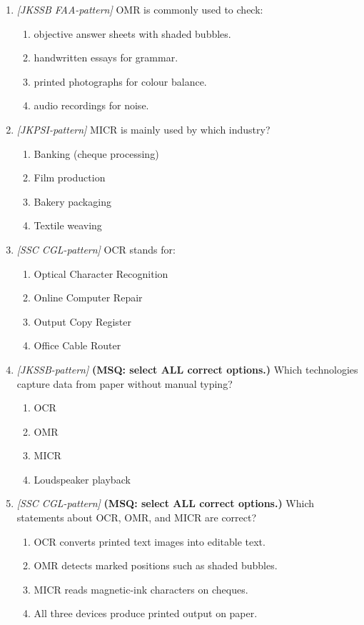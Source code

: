 \documentclass[11pt]{article}
\begin{document}
\begin{enumerate}[label=\textbf{Q\arabic*.}, leftmargin=*]
\item \textit{[JKSSB FAA-pattern]} OMR is commonly used to check:
  \begin{enumerate}[label=\Alph*.]
    \item objective answer sheets with shaded bubbles.
    \item handwritten essays for grammar.
    \item printed photographs for colour balance.
    \item audio recordings for noise.
  \end{enumerate}
\item \textit{[JKPSI-pattern]} MICR is mainly used by which industry?
  \begin{enumerate}[label=\Alph*.]
    \item Banking (cheque processing)
    \item Film production
    \item Bakery packaging
    \item Textile weaving
  \end{enumerate}
\item \textit{[SSC CGL-pattern]} OCR stands for:
  \begin{enumerate}[label=\Alph*.]
    \item Optical Character Recognition
    \item Online Computer Repair
    \item Output Copy Register
    \item Office Cable Router
  \end{enumerate}
\item \textit{[JKSSB-pattern]} \textbf{(MSQ: select ALL correct options.)} Which technologies capture data from paper without manual typing?
  \begin{enumerate}[label=\Alph*.]
    \item OCR
    \item OMR
    \item MICR
    \item Loudspeaker playback
  \end{enumerate}
\item \textit{[SSC CGL-pattern]} \textbf{(MSQ: select ALL correct options.)} Which statements about OCR, OMR, and MICR are correct?
  \begin{enumerate}[label=\Alph*.]
    \item OCR converts printed text images into editable text.
    \item OMR detects marked positions such as shaded bubbles.
    \item MICR reads magnetic-ink characters on cheques.
    \item All three devices produce printed output on paper.
  \end{enumerate}
\end{enumerate}
\def\JKSSBLessonID{13}\def\JKSSBAnswers{0}
\end{document}

